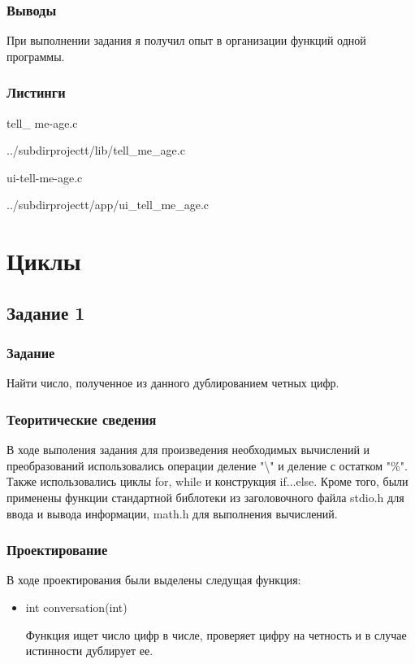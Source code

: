 \documentclass[12pt,a4paper]{report}
\begin{document}
\subsection{Выводы}

При выполнении задания я получил опыт в организации функций одной программы.

\subsection*{Листинги}
tell\_ me-age.c

{../subdirprojectt/lib/tell_me_age.c}

\vspace{\baselineskip}

ui-tell-me-age.c

{../subdirprojectt/app/ui_tell_me_age.c}


\chapter{Циклы}
\section{Задание 1}
\subsection{Задание}

Найти число, полученное из данного дублированием четных цифр.

\subsection{Теоритические сведения}

В ходе выполения задания для произведения необходимых вычислений и преобразований использовались операции деление "\textbackslash" и деление с остатком "\%". Также использовались циклы for, while и конструкция if...else. Кроме того, были применены функции стандартной библотеки из заголовочного файла stdio.h для ввода и вывода информации, math.h для выполнения вычислений.


\subsection{Проектирование}

В ходе проектирования были выделены следущая функция:

\begin{itemize}
	\item int conversation(int)

	Функция ищет число цифр в числе, проверяет цифру на четность и в случае истинности дублирует ее.
\end{itemize}
\end{document}
